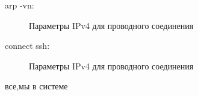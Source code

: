 

arp -vn:


\begin{figure}[h!]
\caption{ Параметры IPv4 для проводного соединения }
\label{ssh_1:ssh_1}
\end{figure}

connect ssh:

\begin{figure}[h!]
\caption{ Параметры IPv4 для проводного соединения }
\label{ssh_2:ssh_2}
\end{figure}

все,мы в системе

\clearpage
